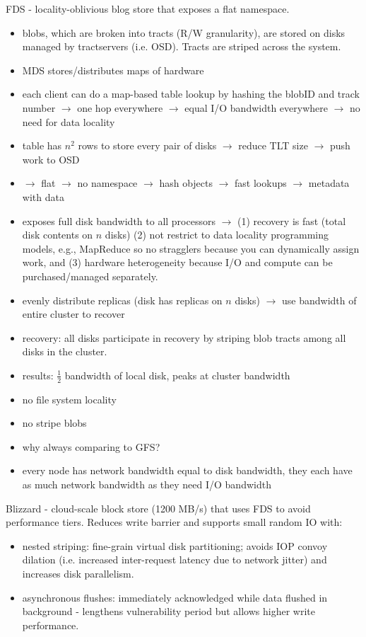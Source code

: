 \documentclass{article}
\newcommand{\xmark}{\ding{55}}%
\begin{document}
\noindent\cite{nightingale:osdi2012-fds} FDS - locality-oblivious blog store that exposes a flat namespace.
\begin{itemize}
	\item blobs, which are broken into tracts (R/W granularity), are stored on disks managed by tractservers (i.e. OSD). Tracts are striped across the system.
	\item MDS stores/distributes maps of hardware 
	\item each client can do a map-based table lookup by hashing the blobID and track number \(\rightarrow\) one hop everywhere \(\rightarrow\) equal I/O bandwidth everywhere \(\rightarrow\) no need for data locality
	\item table has \(n^2\) rows to store every pair of disks \(\rightarrow\) reduce TLT size \(\rightarrow\) push work to OSD
	\item \(\rightarrow\) flat \(\rightarrow\) no namespace \(\rightarrow\)  hash objects \(\rightarrow\) fast lookups \(\rightarrow\)  metadata with data
	\item exposes full disk bandwidth to all processors \(\rightarrow\) (1) recovery is fast (total disk contents on \(n\) disks) (2) not restrict to data locality programming models, e.g., MapReduce so no stragglers because you can dynamically assign work, and (3) hardware heterogeneity because I/O and compute can be purchased/managed separately.
	\item evenly distribute replicas (disk has replicas on \(n\) disks) \(\rightarrow\) use bandwidth of entire cluster to recover
	\item recovery: all disks participate in recovery by striping blob tracts among all disks in the cluster.
	\item results: \(\frac{1}{2}\) bandwidth of local disk, peaks at cluster bandwidth
	\item[\xmark] no file system locality
	\item[\xmark] no stripe blobs
	\item[\xmark] why always comparing to GFS?
	\item[\xmark] every node has network bandwidth equal to disk bandwidth, they each have as much network bandwidth as they need I/O bandwidth		
\end{itemize}

\noindent\cite{mickens:ndsi2014-blizzard} Blizzard - cloud-scale block store (1200 MB/s) that uses FDS to avoid performance tiers. Reduces write barrier and supports small random IO with:
\begin{itemize}
	\item nested striping: fine-grain virtual disk partitioning; avoids IOP convoy dilation (i.e. increased inter-request latency due to network jitter) and increases disk parallelism. 
	\item asynchronous flushes: immediately acknowledged while data flushed in background - lengthens vulnerability period but allows higher write performance. 
\end{itemize}
\end{document}
